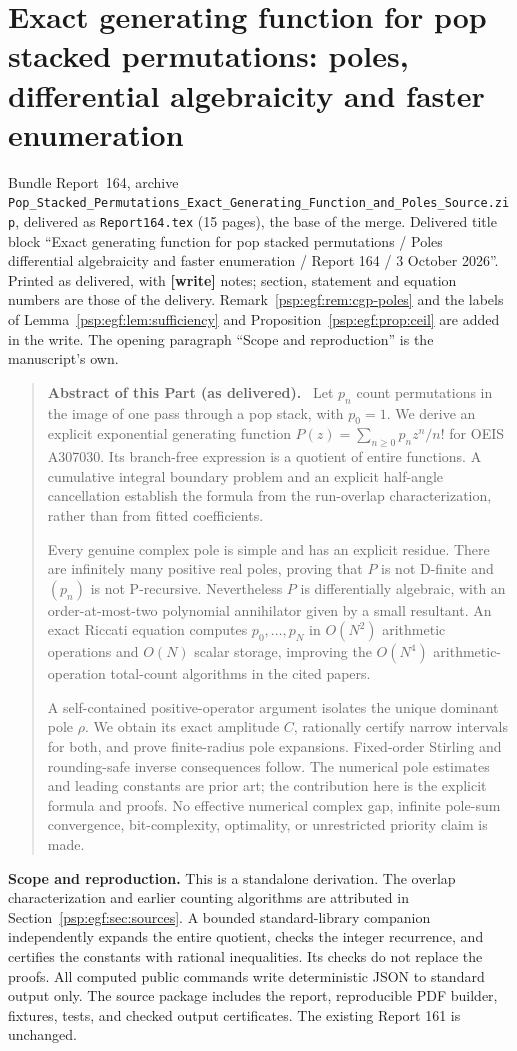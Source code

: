 \documentclass[11pt,letterpaper]{article}
\numberwithin{equation}{section}
\theoremstyle{remark}\newtheorem{remark}[theorem]{Remark}
\newcommand{\file}[1]{\nolinkurl{#1}}
\newenvironment{partabstract}{\begin{quote}\small\noindent\textbf{Abstract of this Part (as delivered).}\ }{\end{quote}}
\newcommand{\partsource}[1]{\par\noindent\begin{minipage}{\textwidth}\small #1\end{minipage}\par\medskip}
\begin{document}
\part{Exact generating function for pop stacked permutations: poles, differential algebraicity and faster enumeration}\label{psp:egf:part}
\partsource{Bundle Report~164, archive \file{Pop_Stacked_Permutations_Exact_Generating_Function_and_Poles_Source.zip}, delivered as \file{Report164.tex} (15 pages), the base of the merge. Delivered title block ``Exact generating function for pop stacked permutations / Poles differential algebraicity and faster enumeration / Report 164 / 3 October 2026''. Printed as delivered, with \textbf{[write]} notes; section, statement and equation numbers are those of the delivery. Remark~\ref{psp:egf:rem:cgp-poles} and the labels of Lemma~\ref{psp:egf:lem:sufficiency} and Proposition~\ref{psp:egf:prop:ceil} are added in the write. The opening paragraph ``Scope and reproduction'' is the manuscript's own.}
\begin{partabstract}
Let $p_n$ count permutations in the image of one pass through a pop stack,
with $p_0=1$. We derive an explicit exponential generating function
$P(z)=\sum_{n\geq0}p_nz^n/n!$ for OEIS A307030. Its branch-free expression
is a quotient of entire functions. A cumulative integral boundary problem
and an explicit half-angle cancellation establish the formula from the
run-overlap characterization, rather than from fitted coefficients.

Every genuine complex pole is simple and has an explicit residue.
There are infinitely many positive real poles, proving that $P$ is not
D-finite and $(p_n)$ is not P-recursive. Nevertheless $P$ is differentially
algebraic, with an order-at-most-two polynomial annihilator given by a
small resultant. An exact Riccati equation computes $p_0,\ldots,p_N$ in
$O(N^2)$ arithmetic operations and $O(N)$ scalar storage, improving the
$O(N^4)$ arithmetic-operation total-count algorithms in the cited papers.

A self-contained positive-operator argument isolates the unique dominant
pole $\rho$. We obtain its exact amplitude $C$, rationally certify narrow
intervals for both, and prove finite-radius pole expansions. Fixed-order
Stirling and rounding-safe inverse consequences follow. The numerical
pole estimates and leading constants are prior art; the contribution here
is the explicit formula and proofs. No effective numerical complex gap,
infinite pole-sum convergence, bit-complexity, optimality, or unrestricted
priority claim is made.
\end{partabstract}
\noindent\textbf{Scope and reproduction.}
This is a standalone derivation. The overlap characterization and earlier
counting algorithms are attributed in Section~\ref{psp:egf:sec:sources}. A bounded
standard-library companion independently expands the entire quotient,
checks the integer recurrence, and certifies the constants with rational
inequalities. Its checks do not replace the proofs. All computed public
commands write deterministic JSON to standard output only. The source
package includes the report, reproducible PDF builder, fixtures, tests,
and checked output certificates. The existing Report 161 is unchanged.
\end{document}
